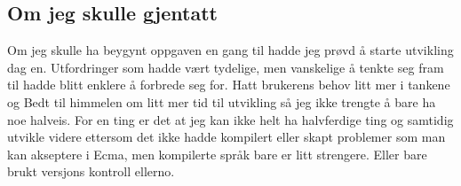 \documentclass{article}
\begin{document}
\subsection{Om jeg skulle gjentatt}
Om jeg skulle ha beygynt oppgaven en gang til hadde jeg prøvd å starte utvikling dag en. Utfordringer som hadde vært tydelige, men vanskelige å tenkte seg fram til hadde blitt enklere å forbrede seg for. Hatt brukerens behov litt mer i tankene og Bedt til himmelen om litt mer tid til utvikling så jeg ikke trengte å bare ha noe halveis.
For en ting er det at jeg kan ikke helt ha halvferdige ting og samtidig utvikle videre ettersom det ikke hadde kompilert eller skapt problemer som man kan akseptere i Ecma, men kompilerte språk bare er litt strengere. Eller bare brukt versjons kontroll ellerno.
\end{document}
